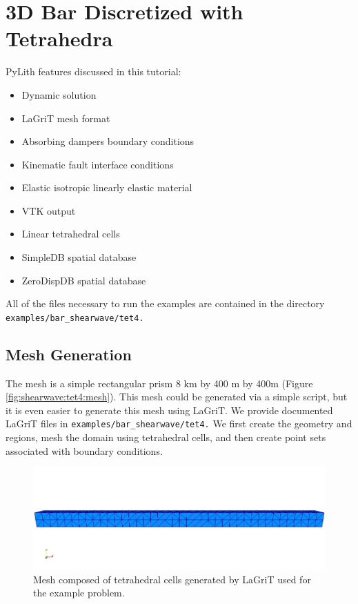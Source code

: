 
\section{\label{sec:tutorial:shearwave:tet4}3D Bar Discretized with Tetrahedra}

PyLith features discussed in this tutorial:
\begin{itemize}
\item Dynamic solution
\item LaGriT mesh format
\item Absorbing dampers boundary conditions
\item Kinematic fault interface conditions
\item Elastic isotropic linearly elastic material
\item VTK output
\item Linear tetrahedral cells
\item SimpleDB spatial database
\item ZeroDispDB spatial database
\end{itemize}
All of the files necessary to run the examples are contained in the
directory \texttt{examples/bar\_shearwave/tet4.}


\subsection{Mesh Generation}

The mesh is a simple rectangular prism 8 km by 400 m by 400m (Figure
\vref{fig:shearwave:tet4:mesh}). This mesh could be generated via
a simple script, but it is even easier to generate this mesh using
LaGriT. We provide documented LaGriT files in \texttt{examples/bar\_shearwave/tet4.}
We first create the geometry and regions, mesh the domain using tetrahedral
cells, and then create point sets associated with boundary conditions.

\noindent \begin{center}
\begin{figure}
\begin{centering}
\includegraphics[scale=0.5]{tutorials/shearwave/figs/tet4mesh}
\par\end{centering}

\caption{Mesh composed of tetrahedral cells generated by LaGriT used for the
example problem.\label{fig:shearwave:tet4:mesh}}
\end{figure}

\par\end{center}


